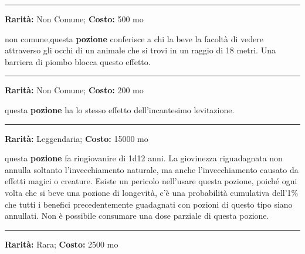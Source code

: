 \begin{multicols}{2}
\smallskip\noindent\rule{\linewidth}{2pt}  \hypertarget{PozionedellaChiaroveggenzaanimale}{}\smallskip{}\noindent\label{PozionedellaChiaroveggenzaanimale}

\textbf{Rarità:} Non Comune; \textbf{Costo:} 500 mo

non comune,questa \textbf{pozione} conferisce a chi la beve la facoltà di vedere attraverso gli occhi di un animale che si trovi in un raggio di 18 metri. Una barriera di piombo blocca questo effetto.

\smallskip\noindent\rule{\linewidth}{2pt}  \hypertarget{PozionedellaLevitazione}{}\smallskip{}\noindent\label{PozionedellaLevitazione}

\textbf{Rarità:} Non Comune; \textbf{Costo:} 200 mo

questa \textbf{pozione} ha lo stesso effetto dell'incantesimo levitazione.

\smallskip\noindent\rule{\linewidth}{2pt}  \hypertarget{PozionedellaLongevità}{}\smallskip{}\noindent\label{PozionedellaLongevità}

\textbf{Rarità:} Leggendaria; \textbf{Costo:} 15000 mo

questa \textbf{pozione} fa ringiovanire di 1d12 anni. La giovinezza riguadagnata non annulla soltanto l'invecchiamento naturale, ma anche l'invecchiamento causato da effetti magici o creature. Esiste un pericolo nell'usare questa pozione, poiché ogni volta che si beve una pozione di longevità, c'è una probabilità cumulativa dell'1\% che tutti i benefici precedentemente guadagnati con pozioni di questo tipo siano annullati. Non è possibile consumare una dose parziale di questa pozione.

\smallskip\noindent\rule{\linewidth}{2pt}  \hypertarget{PozionedellaMetamorfosi}{}\smallskip{}\noindent\label{PozionedellaMetamorfosi}

\textbf{Rarità:} Rara; \textbf{Costo:} 2500 mo


\end{multicols}
